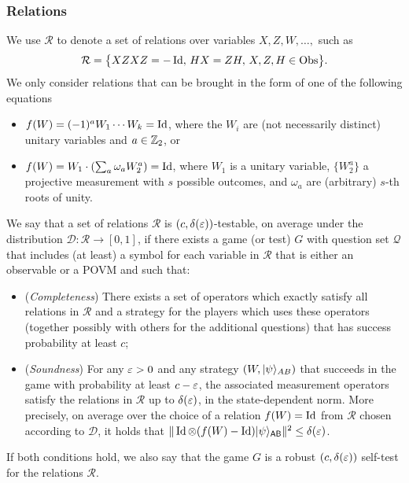 \subsubsection{Relations}

We use $\mathcal{R}$ to denote a set of relations over variables $X,Z,W,\ldots,$ such as
$$\mathcal{R}=\big\{XZXZ=-\mathop{\rm Id}\nolimits,\, HX=ZH,\,X,Z,H\in\mathrm{Obs}\big\}.$$
We only consider relations that can be brought in the form of  one of the following
equations
\begin{itemize}
  \item  $f(W) = (-1)^a W_1\cdots W_k = \mathop{\rm Id}\nolimits$, where the $W_i$ are (not necessarily distinct) unitary variables and $a\in\mathbb{Z}_2$, or
  \item $f(W) = W_1 \cdot ( \sum_a \omega_a W_2^a)=\mathop{\rm Id}\nolimits$, where $W_1$ is a unitary variable, $\{W_2^a\}$ a projective measurement with $s$ possible outcomes, and $\omega_a$ are (arbitrary) $s$-th roots of unity.
\end{itemize}

\begin{definition}
We say that a set of relations $\mathcal{R}$ is $(c,\delta(\varepsilon))$-testable, on average under the distribution $\mathcal{D}:\mathcal{R}\to[0,1]$, if
  there exists a game (or test) $G$ with question set $\mathcal{Q}$ that
  includes (at least) a symbol for each variable in $\mathcal{R}$ that is either
  an observable or a POVM and such that:
\begin{itemize}
\item (\emph{Completeness}) There exists a set of operators which exactly satisfy all relations in $\mathcal{R}$ and a strategy for the players which uses these operators (together possibly with others for the additional questions) that has success probability at least $c$;
\item (\emph{Soundness}) For any $\varepsilon>0$ and any strategy $(W,|\psi\rangle_{AB})$ that succeeds in the game with probability at least $c-\varepsilon$, the associated measurement operators satisfy the relations in $\mathcal{R}$ up to $\delta(\varepsilon)$, in the state-dependent norm. More precisely, on average
 over the choice of a relation $f(W)=\mathop{\rm Id}\nolimits$ from $\mathcal{R}$ chosen according to $\mathcal{D}$, it holds that $\| \mathop{\rm Id}\nolimits\otimes (f(W)-\mathop{\rm Id}\nolimits) |\psi\rangle_{{\textsf{AB}}}\|^2 \leq \delta(\varepsilon)$.
\end{itemize}
If both conditions hold, we also say that the game $G$ is a robust $(c,\delta(\varepsilon))$ self-test for the relations $\mathcal{R}$. 
\end{definition}

